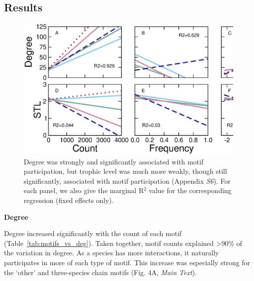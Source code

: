 \documentclass[12pt]{article}
\begin{document}
	\subsection*{Results}

	    \begin{figure}[ht!]
	        \centering
	        \includegraphics[width=\textwidth]{figures/motifs_vs_degTL.eps}
	        \caption{Degree was strongly and significantly associated with motif participation, but trophic level was much more weakly, though still significantly, associated with motif participation (Appendix \emph{S6}). For each panel, we also give the marginal R$^2$ value for the corresponding regression (fixed effects only).}
	        \label{fig:motifs_degTL}
	    \end{figure}


		\textbf{Degree}

			Degree increased significantly with the count of each motif (Table~\ref{tab:motifs_vs_deg}).
			Taken together, motif counts explained \textgreater90\% of the variation in degree. 
			As a species has more interactions, it naturally participates in more of each type of motif.
			This increase was especially strong for the `other' and three-species chain motifs (Fig. 4A, \emph{Main Text}).
\end{document}
